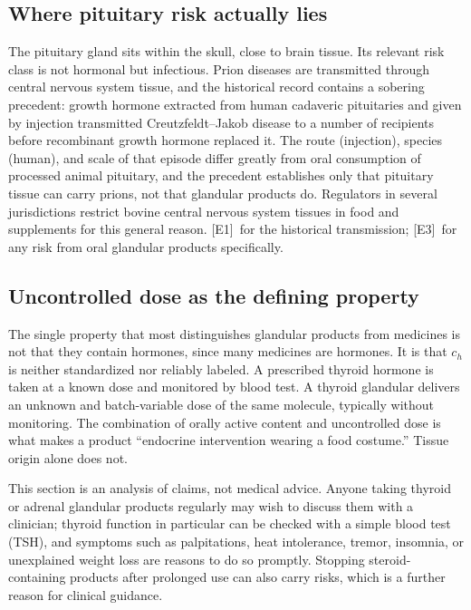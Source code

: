 \documentclass[11pt,a4paper]{article}
\theoremstyle{plain}
\theoremstyle{definition}
\theoremstyle{remark}
\newcommand{\tier}[1]{\textup{\textsc{[#1]}}}
\newcommand{\Eone}{\tier{E1}}
\newcommand{\Ethree}{\tier{E3}}
\begin{document}
\subsection{Where pituitary risk actually lies}

The pituitary gland sits within the skull, close to brain tissue. Its relevant risk class is not hormonal but infectious. Prion diseases are transmitted through central nervous system tissue, and the historical record contains a sobering precedent: growth hormone extracted from human cadaveric pituitaries and given by injection transmitted Creutzfeldt--Jakob disease to a number of recipients before recombinant growth hormone replaced it. The route (injection), species (human), and scale of that episode differ greatly from oral consumption of processed animal pituitary, and the precedent establishes only that pituitary tissue can carry prions, not that glandular products do. Regulators in several jurisdictions restrict bovine central nervous system tissues in food and supplements for this general reason. \Eone\ for the historical transmission; \Ethree\ for any risk from oral glandular products specifically.

\subsection{Uncontrolled dose as the defining property}

The single property that most distinguishes glandular products from medicines is not that they contain hormones, since many medicines are hormones. It is that $c_h$ is neither standardized nor reliably labeled. A prescribed thyroid hormone is taken at a known dose and monitored by blood test. A thyroid glandular delivers an unknown and batch-variable dose of the same molecule, typically without monitoring. The combination of orally active content and uncontrolled dose is what makes a product ``endocrine intervention wearing a food costume.'' Tissue origin alone does not.

\begin{caution}
This section is an analysis of claims, not medical advice. Anyone taking thyroid or adrenal glandular products regularly may wish to discuss them with a clinician; thyroid function in particular can be checked with a simple blood test (TSH), and symptoms such as palpitations, heat intolerance, tremor, insomnia, or unexplained weight loss are reasons to do so promptly. Stopping steroid-containing products after prolonged use can also carry risks, which is a further reason for clinical guidance.
\end{caution}
\end{document}
